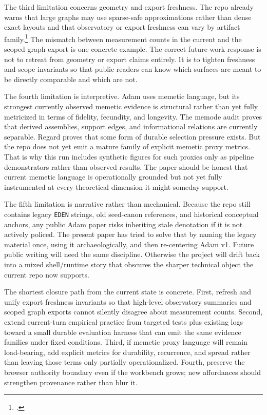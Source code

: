 \documentclass[10pt]{article}
\begin{document}
The third limitation concerns geometry and export freshness. The repo already warns that large graphs may use sparse-safe approximations rather than dense exact layouts and that observatory or export freshness can vary by artifact family.\footnote{.} The mismatch between measurement counts in the current  and the scoped graph export is one concrete example. The correct future-work response is not to retreat from geometry or export claims entirely. It is to tighten freshness and scope invariants so that public readers can know which surfaces are meant to be directly comparable and which are not.

The fourth limitation is interpretive. Adam uses memetic language, but its strongest currently observed memetic evidence is structural rather than yet fully metricized in terms of fidelity, fecundity, and longevity. The memode audit proves that derived assemblies, support edges, and informational relations are currently separable. Regard proves that some form of durable selection pressure exists. But the repo does not yet emit a mature family of explicit memetic proxy metrics. That is why this run includes synthetic figures for such proxies only as pipeline demonstrators rather than observed results. The paper should be honest that current memetic language is operationally grounded but not yet fully instrumented at every theoretical dimension it might someday support.

The fifth limitation is narrative rather than mechanical. Because the repo still contains legacy \texttt{EDEN} strings, old seed-canon references, and historical conceptual anchors, any public Adam paper risks inheriting stale denotation if it is not actively policed. The present paper has tried to solve that by naming the legacy material once, using it archaeologically, and then re-centering Adam v1. Future public writing will need the same discipline. Otherwise the project will drift back into a mixed shell/runtime story that obscures the sharper technical object the current repo now supports.

The shortest closure path from the current state is concrete. First, refresh and unify export freshness invariants so that high-level observatory summaries and scoped graph exports cannot silently disagree about measurement counts. Second, extend current-turn empirical practice from targeted tests plus existing logs toward a small durable evaluation harness that can emit the same evidence families under fixed conditions. Third, if memetic proxy language will remain load-bearing, add explicit metrics for durability, recurrence, and spread rather than leaving those terms only partially operationalized. Fourth, preserve the browser authority boundary even if the workbench grows; new affordances should strengthen provenance rather than blur it.
\end{document}
